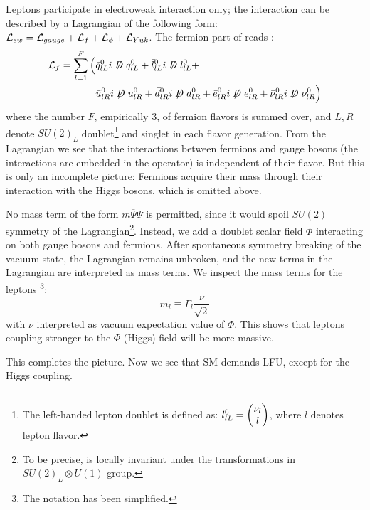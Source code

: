 Leptons participate in electroweak interaction only;
the interaction can be described by a Lagrangian of the following form:
$\mathcal{L}_{ew} = \mathcal{L}_{gauge} + \mathcal{L}_{f} + \mathcal{L}_{\phi} + \mathcal{L}_{Yuk}$.
The fermion part of  reads \cite{Langacker:2010zza}:
\begin{align}
    \Lden{f} = \sum_{l = 1}^F \Big(
        & \bar{\spin{q}}^0_{lL} i \fsl{D} \spin{q}^0_{lL} +
          \bar{\spin{l}}^0_{lL} i \fsl{D} \spin{l}^0_{lL} + \nonumber \\
        & \bar{u}^0_{lR} i \fsl{D} u^0_{lR} +
          \bar{d}^0_{lR} i \fsl{D} d^0_{lR} +
          \bar{e}^0_{lR} i \fsl{D} e^0_{lR} +
          \bar{\nu}^0_{lR} i \fsl{D} \nu^0_{lR}
    \Big)
\end{align}
where the number $F$, empirically 3, of fermion flavors is summed over, and
$L,R$ denote $SU(2)_L$ doublet\footnote{
    The left-handed lepton doublet is defined as:
    $l^0_{lL} = \begin{pmatrix} \nu_l \\ l \end{pmatrix}$,
    where $l$ denotes lepton flavor.
}
and singlet in each flavor generation.
From the Lagrangian we see that the interactions between fermions and gauge
bosons (the interactions are embedded in the  operator) is independent
of their flavor.
But this is only an incomplete picture:
Fermions acquire their mass through their interaction with the Higgs bosons,
which is omitted above.

No mass term of the form $m \overline{\Psi} \Psi$ is permitted, since it would
spoil $SU(2)$ symmetry of the Lagrangian\footnote{
    To be precise,  is locally invariant under the transformations in
    $SU(2)_L \otimes U(1)$ group.
}.
Instead, we add a doublet scalar field $\Phi$ interacting on both gauge bosons
and fermions.
After spontaneous symmetry breaking of the vacuum state, the Lagrangian remains
unbroken, and the new terms in the Lagrangian are interpreted as mass terms.
We inspect the mass terms for the leptons \cite{Langacker:2010zza}\footnote{
    The notation has been simplified.
}:
\begin{equation}
    m_l \equiv \Gamma_l \frac{\nu}{\sqrt{2}}
\end{equation}
with $\nu$ interpreted as vacuum expectation value of $\Phi$.
This shows that leptons coupling stronger to the $\Phi$ (Higgs) field will be
more massive.

This completes the picture.
Now we see that SM demands LFU, except for the Higgs coupling.

